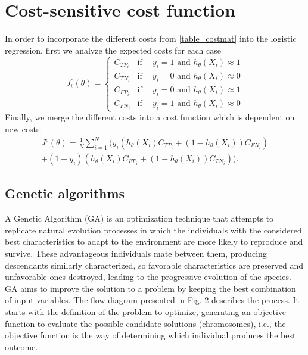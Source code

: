 	
\section{Cost-sensitive cost function}
  In order to incorporate the different costs from \tablename{ \ref{table_costmat}} into the 
  logistic regression, first we analyze the expected costs for each case
  \begin{equation*}
    J^c_i(\theta) = 
    \begin{cases}
      C_{TP_i}    & \text{if} \phantom{-}  y_i = 1 \text{ and } h_\theta(X_i) \approx 1  \\
      C_{TN_i}    & \text{if} \phantom{-}  y_i = 0 \text{ and } h_\theta(X_i) \approx 0  \\
      C_{FP_i}    & \text{if} \phantom{-}  y_i = 0 \text{ and } h_\theta(X_i) \approx 1  \\
      C_{FN_i}    & \text{if} \phantom{-}  y_i = 1 \text{ and } h_\theta(X_i) \approx 0 
    \end{cases}
  \end{equation*}
  Finally, we merge the different costs into a cost function which is dependent on new costs:
  \begin{align}\label{eq:CSLR}
    J^c(\theta)=\frac{1}{N} \sum_{i=1}^{N} \bigg( y_i(h_\theta(X_i) C_{TP_i} + 
    (1-h_\theta(X_i))C_{FN_i})  \nonumber\\ 
    +(1-y_i)(h_\theta(X_i) C_{FP_i} + (1-h_\theta(X_i))C_{TN_i}) \bigg).
  \end{align}
  
\subsection{Genetic algorithms}

A Genetic Algorithm (GA) is an optimization technique that attempts to replicate natural evolution 
processes in which the individuals with the considered best characteristics to adapt to the 
environment are more likely to reproduce and survive. These advantageous individuals mate between 
them, producing descendants similarly characterized, so favorable characteristics are preserved and 
unfavorable ones destroyed, leading to the progressive evolution of the species.
GA aims to improve the solution to a problem by keeping the best combination of input variables. The 
flow diagram presented in Fig. 2 describes the process. It starts with the definition of the problem 
to optimize, generating an objective function to evaluate the possible candidate solutions 
(chromosomes), i.e., the objective function is the way of determining which individual produces the 
best outcome. 

